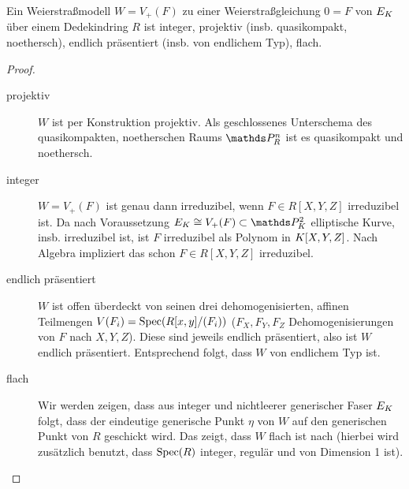 \documentclass[german]{scrreprt}
\begin{document}
\begin{Lemma}\label{thm:eigweierstrassmodelle}
  Ein Weierstraßmodell $W=V_+(F)$ zu einer Weierstraßgleichung $0=F$
  von $E_{K}$ über einem Dedekindring $R$ ist
  integer,
  projektiv (insb. quasikompakt, noethersch),
  endlich präsentiert (insb. von endlichem Typ),
  flach.
  \begin{proof}
    \begin{description}
    \item[projektiv] $W$ ist per Konstruktion projektiv. Als
      geschlossenes Unterschema des quasikompakten, noetherschen Raums
      $\P_R^n$ ist es quasikompakt und noethersch.
    \item[integer]
      $W=V_+(F)$ ist genau dann irreduzibel, wenn $F\in R[X,Y,Z]$
      irreduzibel ist.
      Da nach Voraussetzung $E_\K\cong V_+(F)\subset\P_\K^2$
      elliptische Kurve, insb. irreduzibel ist, ist $F$ irreduzibel
      als Polynom in $K[X,Y,Z]$. Nach Algebra impliziert das schon
      $F\in R[X,Y,Z]$ irreduzibel.
    \item[endlich präsentiert]
      $W$ ist offen überdeckt von seinen drei dehomogenisierten,
      affinen Teilmengen $V(F_i)=\operatorname{Spec}(R[x,y]/(F_i))$ ($F_X,F_Y,F_Z$
      Dehomogenisierungen von $F$ nach $X,Y,Z$). Diese sind jeweils
      endlich präsentiert, also ist $W$ endlich präsentiert.
      Entsprechend folgt, dass $W$ von endlichem Typ ist.
    \item[flach]
      Wir werden zeigen, dass aus integer und nichtleerer generischer
      Faser $E_{K}$ folgt, dass der eindeutige generische Punkt $\eta$
      von $W$ auf den generischen Punkt von $R$ geschickt wird.
      Das zeigt, dass $W$ flach ist
      nach \cite[Proposition III.9.7]{hartshorne}
      (hierbei wird zusätzlich benutzt, dass $\operatorname{Spec}(R)$ integer,
      regulär und von Dimension 1 ist).
      

\end{description}
\end{proof}
\end{Lemma}
\end{document}
